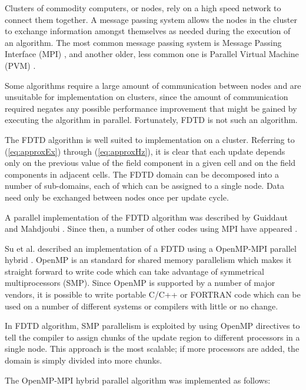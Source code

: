 \documentclass[11pt, conference, draftcls, letterpaper]{IEEEtran}
\begin{document}
Clusters of commodity computers, or nodes, rely on a high speed
network to connect them together. A message passing system allows the
nodes in the cluster to exchange information amongst themselves as
needed during the execution of an algorithm. The most common message
passing system is Message Passing Interface (MPI) \cite{}, and another
older, less common one is Parallel Virtual Machine (PVM) \cite{}.

Some algorithms require a large amount of communication between nodes
and are unsuitable for implementation on clusters, since the amount of
communication required negates any possible performance improvement
that might be gained by executing the algorithm in parallel.
Fortunately, FDTD is not such an algorithm.

The FDTD algorithm is well suited to implementation on a
cluster. Referring to (\ref{eq:approxEx}) through (\ref{eq:approxHz}),
it is clear that each update depends only on the previous value of the
field component in a given cell and on the field components in
adjacent cells. The FDTD domain can be decomposed into a number of
sub-domains, each of which can be assigned to a single node. Data need
only be exchanged between nodes once per update cycle. 

A parallel implementation of the FDTD algorithm was described by
Guiddaut and Mahdjoubi \cite{guiffaut2001}. Since then, a number of
other codes using MPI have appeared \cite{}. 

Su et al. described an implementation of a FDTD using a OpenMP-MPI
parallel hybrid \cite{su2004}. OpenMP is an standard for shared memory
parallelism which makes it straight forward to write code which can
take advantage of symmetrical multiprocessors (SMP). Since OpenMP is
supported by a number of major vendors, it is possible to write
portable C/C++ or FORTRAN code which can be used on a number of
different systems or compilers with little or no change. 

In FDTD algorithm, SMP parallelism is exploited by using OpenMP
directives to tell the compiler to assign chunks of the update region
to different processors in a single node. This approach is the most
scalable; if more processors are added, the domain is simply divided
into more chunks.

The OpenMP-MPI hybrid parallel algorithm was implemented as follows:
\end{document}
